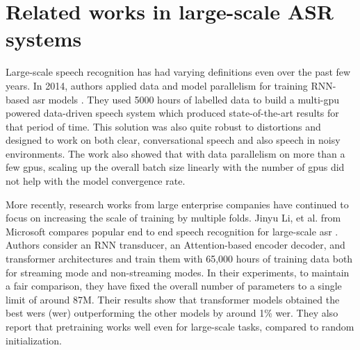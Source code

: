 \section{Related works in large-scale ASR systems}
\label{section:largescale_related}
Large-scale speech recognition has had varying definitions even over the past few years. In 2014, authors applied data and model parallelism for training RNN-based \acrshort{asr} models \cite{Hannun2014DeepRecognition}. They used 5000 hours of labelled data to build a multi-\acrshort{gpu} powered data-driven speech system which produced state-of-the-art results for that period of time. This solution was also quite robust to distortions and designed to work on both clear, conversational speech and also speech in noisy environments. The work also showed that with data parallelism on more than a few \acrshort{gpu}s, scaling up the overall batch size linearly with the number of \acrshort{gpu}s did not help with the model convergence rate.

More recently, research works from large enterprise companies have continued to focus on increasing the scale of training by multiple folds. Jinyu Li, et al. from Microsoft compares popular end to end speech recognition for large-scale \acrshort{asr} \cite{Li2020OnRecognition}. Authors consider an RNN transducer, an Attention-based encoder decoder, and transformer architectures and train them with 65,000 hours of training data both for streaming mode and non-streaming modes. In their experiments, to maintain a fair comparison, they have fixed the overall number of parameters to a single limit of around 87M. Their results show that transformer models obtained the best \acrlong{wer}s (\acrshort{wer}) outperforming the other models by around 1\% \acrshort{wer}. They also report that pretraining works well even for large-scale tasks, compared to random initialization.

